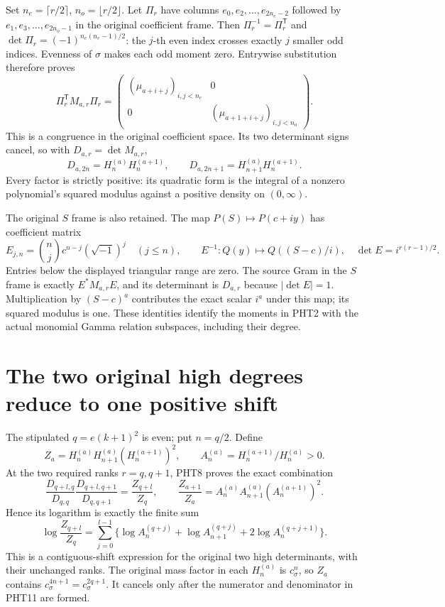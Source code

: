 Set $n_e=\lceil r/2\rceil$, $n_o=\lfloor r/2\rfloor$.
Let $\Pi_r$ have columns $e_0,e_2,\ldots,e_{2n_e-2}$ followed
by $e_1,e_3,\ldots,e_{2n_o-1}$ in the original coefficient
frame. Then $\Pi_r^{-1}=\Pi_r^{\mathsf T}$ and
$\det\Pi_r=(-1)^{n_e(n_e-1)/2}$: the $j$-th even index crosses
exactly $j$ smaller odd indices. Evenness of $\sigma$ makes
each odd moment zero. Entrywise substitution therefore proves
\[
 \Pi_r^{\mathsf T}M_{a,r}\Pi_r
 =\begin{pmatrix}
  (\mu_{a+i+j})_{i,j<n_e}&0\\
  0&(\mu_{a+1+i+j})_{i,j<n_o}
 \end{pmatrix}.
\tag{PHT7}
\]
This is a congruence in the original coefficient space. Its
two determinant signs cancel, so with $D_{a,r}=\det M_{a,r}$,
\[
 D_{a,2n}=H_n^{(a)}H_n^{(a+1)},\qquad
 D_{a,2n+1}=H_{n+1}^{(a)}H_n^{(a+1)}.
\tag{PHT8}
\]
Every factor is strictly positive: its quadratic form is
the integral of a nonzero polynomial's squared modulus
against a positive density on $(0,\infty)$.

The original $S$ frame is also retained. The map
$P(S)\mapsto P(c+iy)$ has coefficient matrix
\[
 E_{j,n}=\binom nj c^{n-j}(\sqrt{-1})^j\quad(j\leq n),\qquad
 E^{-1}:Q(y)\mapsto Q((S-c)/i),
 \quad\det E=i^{r(r-1)/2}.
\tag{PHT9}
\]
Entries below the displayed triangular range are zero.
The source Gram in the $S$ frame is exactly $E^*M_{a,r}E$,
and its determinant is $D_{a,r}$ because $|\det E|=1$.
Multiplication by $(S-c)^a$ contributes the exact scalar
$i^a$ under this map; its squared modulus is one. These
identities identify the moments in PHT2 with the actual
monomial Gamma relation subspaces, including their degree.

\section{The two original high degrees reduce to one positive shift}

The stipulated $q=e(k+1)^2$ is even; put $n=q/2$. Define
\[
 Z_a=H_n^{(a)}H_{n+1}^{(a)}(H_n^{(a+1)})^2,
 \qquad A_n^{(a)}=H_n^{(a+1)}/H_n^{(a)}>0.
\tag{PHT10}
\]
At the two required ranks $r=q,q+1$, PHT8 proves the exact
combination
\[
 \frac{D_{q+l,q}}{D_{q,q}}
 \frac{D_{q+l,q+1}}{D_{q,q+1}}
 =\frac{Z_{q+l}}{Z_q},\qquad
 \frac{Z_{a+1}}{Z_a}
 =A_n^{(a)}A_{n+1}^{(a)}(A_n^{(a+1)})^2.
\tag{PHT11}
\]
Hence its logarithm is exactly the finite sum
\[
 \log\frac{Z_{q+l}}{Z_q}
 =\sum_{j=0}^{l-1}
  \{\log A_n^{(q+j)}+\log A_{n+1}^{(q+j)}
                              +2\log A_n^{(q+j+1)}\}.
\tag{PHT12}
\]
This is a contiguous-shift expression for the original two
high determinants, with their unchanged ranks. The original
mass factor in each $H_n^{(a)}$ is $c_\sigma^n$, so $Z_a$
contains $c_\sigma^{4n+1}=c_\sigma^{2q+1}$. It cancels only
after the numerator and denominator in PHT11 are formed.

